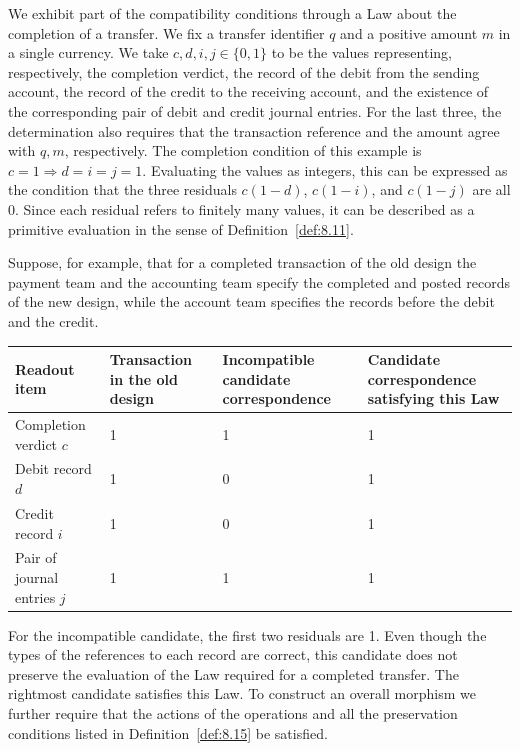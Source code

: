 We exhibit part of the compatibility conditions through a Law about the completion of a
transfer.
We fix a transfer identifier $q$ and a positive amount $m$ in a single currency.
We take $c,d,i,j\in\{0,1\}$ to be the values representing, respectively, the completion
verdict, the record of the debit from the sending account, the record of the credit to the receiving account, and the existence of the corresponding pair of debit and credit journal
entries.
For the last three, the determination also requires that the transaction reference and
the amount agree with $q,m$, respectively.
The completion condition of this example is $c=1\Longrightarrow d=i=j=1$.
Evaluating the values as integers, this can be expressed as the condition that the three
residuals $c(1-d)$, $c(1-i)$, and $c(1-j)$ are all 0.
Since each residual refers to finitely many values, it can be described as a primitive
evaluation in the sense of Definition~\ref{def:8.11}.

Suppose, for example, that for a completed transaction of the old design the payment team and
the accounting team specify the completed and posted records of the new design, while the
account team specifies the records before the debit and the credit.

\begin{xltabular}{\linewidth}{@{}LLLL@{}}
\toprule
Readout item & Transaction in the old design & Incompatible candidate correspondence & Candidate correspondence satisfying this Law \\
\midrule
\endhead
Completion verdict $c$ & 1 & 1 & 1 \\
\addlinespace[3pt]
Debit record $d$ & 1 & 0 & 1 \\
\addlinespace[3pt]
Credit record $i$ & 1 & 0 & 1 \\
\addlinespace[3pt]
Pair of journal entries $j$ & 1 & 1 & 1 \\
\bottomrule
\end{xltabular}

For the incompatible candidate, the first two residuals are 1.
Even though the types of the references to each record are correct, this candidate does
not preserve the evaluation of the Law required for a completed transfer.
The rightmost candidate satisfies this Law. To construct an overall morphism we further
require that the actions of the operations and all the preservation conditions listed in
Definition~\ref{def:8.15} be satisfied.


